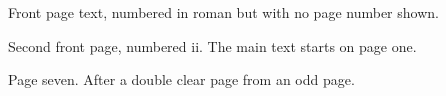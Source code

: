 \documentclass[twoside]{article}
\begin{document}
\thispagestyle{empty}
Front page text, numbered in roman but with no page number shown.

\newpage
Second front page, numbered ii.
\cleardoublepage
{}
The main text starts on page one.

\clearpage
\setcounter{page}{7}
\thispagestyle{plain}
Page seven.
\cleardoublepage
After a double clear page from an odd page.
\end{document}
